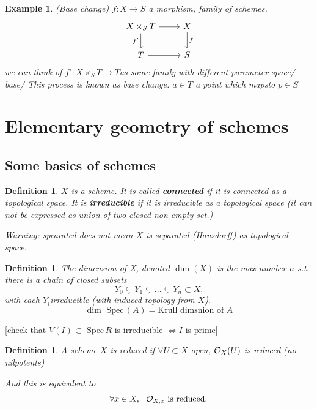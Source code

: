 \documentclass[11pt]{article}
\newtheorem{dfn}[thm]{Definition}
\newtheorem{ex}[thm]{Example}
\newcommand{\spec}{\text{ Spec}\,}
\newcommand{\calo}{{\cal O}}
\newcommand{\lrta}{\longrightarrow}
\newcommand{\Llrta}{\Longleftrightarrow}
\begin{document}
\begin{ex}
(Base change)
$f:X\lrta S$ a morphism, family of schemes.
$$
\begin{tikzcd}
X\times_S T \arrow[d, "f'"'] \arrow[r] & X \arrow[d, "f"] \\
T \arrow[r] & S
\end{tikzcd}
$$
 we can think of $f':X\times_{S}T\lrta T$as some family with different parameter space/ base/
 This process is known as base change. $a\in T$ a point which mapsto $p\in S$
\end{ex}

\section{Elementary geometry of schemes}
\subsection{Some basics of schemes}
\begin{dfn}
$X$ is a scheme. It is called \textbf{connected} if it is connected as a topological space. It is \textbf{irreducible} if it is irreducible as a topological space (it can not be expressed as union of two closed non empty set.)

\underline{Warning:} spearated does not mean $X$ is separated (Hausdorff) as topological space.
\end{dfn}
\begin{dfn}
The dimension of X, denoted $\dim(X)$ is the max number $n$ s.t. there is a chain of closed subsets
$$
Y_0\subsetneq Y_1\subsetneq ...\subsetneq Y_n \subset X.
$$ with each $Y_i$irreducible (with induced topology from $X$).
$$
\dim \spec (A)=\text{Krull dimsnion of $A$}
$$ 
\end{dfn}
[check that $V(I)\subset \spec R$ is irreducible $\Llrta I$ is prime] 

\begin{dfn}
A scheme $X$ is reduced if $\forall U\subset X$ open, $\calo_X(U)$ is reduced (no nilpotents)

And this is equivalent to 
$$
\forall x\in X,\ \  \calo_{X,x} \text{ is reduced.}
$$
\end{dfn}
\end{document}
